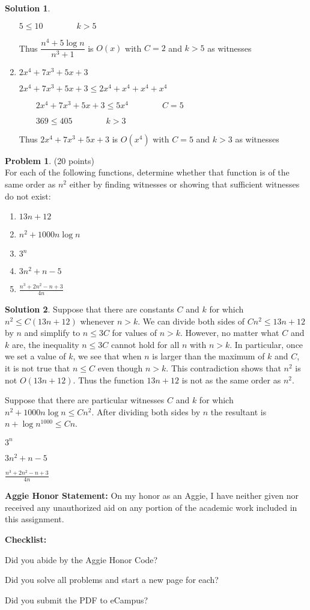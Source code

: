 \documentclass{article}
\theoremstyle{definition}
\newtheorem{problem}{Problem}
\newtheorem*{solution}{Solution}
\newcommand{\honor}{\noindent \textbf{Aggie Honor Statement: }On my honor as an Aggie, I have neither
  given nor received any unauthorized aid on any portion of the academic work included in this assignment.
}
\newcommand{\checklist}{\noindent\textbf{Checklist:}
\begin{compactenum}
\item Did you abide by the Aggie Honor Code?
\item Did you solve all problems and start a new page for each? 
\item Did you submit the PDF to eCampus?
\end{compactenum}
}
\begin{document}
\begin{solution}
\begin{enumerate}
\qquad $5\leq 10\qquad \qquad k>5$

\qquad Thus $\dfrac{n^{4}+5\log {n}}{n^{3}+1}$ is $O(x)$ with $C=2$ and $k>5$
as witnesses

\item $2x^{4}+7x^{3}+5x+3$

\qquad $2x^{4}+7x^{3}+5x+3\leq 2x^{4}+x^{4}+x^{4}+x^{4}$

$\qquad 2x^{4}+7x^{3}+5x+3\leq 5x^{4}\qquad \qquad C=5$

$\qquad 369\leq 405\qquad \qquad k>3$\newline

\qquad Thus $2x^{4}+7x^{3}+5x+3$ is $O(x^{4})$ with $C=5$ and $k>3$ as
witnesses
\end{enumerate}


\end{solution}

\newpage

\begin{problem} (20 points)\\
For each of the following functions, determine whether that function is of the same order as $n^2$ either by finding witnesses or showing that sufficient witnesses do not exist:
\begin{enumerate}
\item $13n+12$
\item $n^2+1000 n\log{n}$
\item $3^n$
\item $3n^2+n-5$
\item $\displaystyle \frac{n^3+2n^2-n+3}{4n}$
\end{enumerate}
\end{problem}



\begin{solution}

\item Suppose that there are constants $C$ and $k$ for which $n^2 \leq C(13n+12)$ whenever $n > k$. We can divide both 
		sides of $Cn^2 \leq 13n+12$ by $n$ and simplify to $n \leq 3C$ for values of $n > k$. However, no matter what 
        $C$ and $k$ are, the inequality $n \leq 3C$ cannot hold for all $n$ with $n > k$. In particular, once we set a 
        value of $k$, we see that when $n$ is larger than the maximum of $k$ and $C$, it is not true that $n \leq C$ 
        even though $n > k$. This contradiction shows that $n^2$ is not $O(13n+12)$. Thus the function $13n+12$ is not 
        as the same order as $n^2$.
\item Suppose that there are particular witnesses $C$ and $k$ for which $n^2+1000n\log{n} \leq Cn^2$. After dividing both sides by $n$ the resultant is $ n + \log{{n}^{1000}}\leq Cn$.
\item $3^n$
\item $3n^2+n-5$
\item $\displaystyle \frac{n^3+2n^2-n+3}{4n}$

\end{solution}

\newpage


\bigskip
\honor

\bigskip
\checklist
\end{document}
